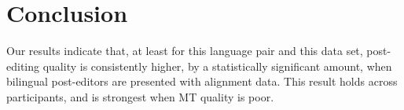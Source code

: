 
\section{Conclusion}


Our results indicate that, at least for this language pair and this data set, post-editing quality is consistently higher, by a statistically significant amount, when bilingual post-editors are presented with alignment data.
%
%
This result holds across participants, and is strongest when MT quality is poor.